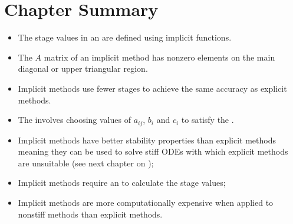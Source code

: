 \documentclass[letterpaper,10pt,english]{jupyterBook}
\begin{document}
\section{Chapter Summary}
\label{\detokenize{3_IRKs/3.3_IRK_summary:chapter-summary}}\label{\detokenize{3_IRKs/3.3_IRK_summary::doc}}\begin{itemize}
\item {} 
\sphinxAtStartPar
The stage values in an {\hyperref[\detokenize{3_IRKs/3.0_IRKs:irk-chapter}]{}} are defined using implicit functions.

\item {} 
\sphinxAtStartPar
The \(A\) matrix of an implicit method has non\sphinxhyphen{}zero elements on the main diagonal or upper triangular region.

\item {} 
\sphinxAtStartPar
Implicit methods use fewer stages to achieve the same accuracy as explicit methods.

\item {} 
\sphinxAtStartPar
The {\hyperref[\detokenize{3_IRKs/3.1_Deriving_IRK_methods:deriving-irk-methods-section}]{}} involves choosing values of \(a_{ij}\), \(b_i\) and \(c_i\) to satisfy the {\hyperref[\detokenize{3_IRKs/3.0_IRKs:bk-ck-dk-order-conditions}]{}}.

\item {} 
\sphinxAtStartPar
Implicit methods have better stability properties than explicit methods meaning they can be used to solve stiff ODEs with which explicit methods are unsuitable (see next chapter on {\hyperref[\detokenize{4_Stability/4.0_Stability:stability-chapter}]{}});

\item {} 
\sphinxAtStartPar
Implicit methods require an {\hyperref[\detokenize{3_IRKs/3.2_Solving_IVPs_using_IRK_methods:solving-ivps-using-irk-methods-section}]{}} to calculate the stage values;

\item {} 
\sphinxAtStartPar
Implicit methods are more computationally expensive when applied to non\sphinxhyphen{}stiff methods than explicit methods.

\end{itemize}
\end{document}
